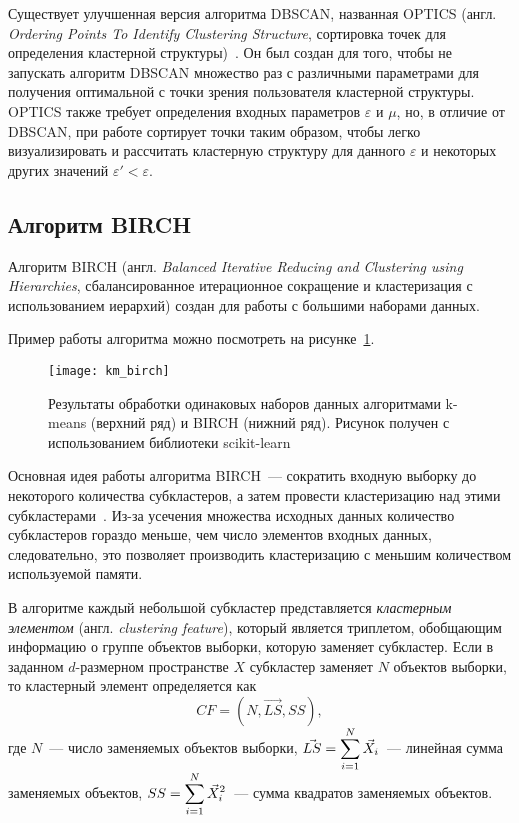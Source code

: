 Существует улучшенная версия алгоритма DBSCAN, названная OPTICS (англ. \emph{Ordering Points To Identify Clustering Structure}, сортировка точек для определения кластерной структуры)~\cite{cod}. Он был создан для того, чтобы не запускать алгоритм DBSCAN множество раз с различными параметрами для получения оптимальной с точки зрения пользователя кластерной структуры. OPTICS также требует определения входных параметров \( \varepsilon \) и \( \mu \), но, в отличие от DBSCAN, при работе сортирует точки таким образом, чтобы легко визуализировать и рассчитать кластерную структуру для данного \( \varepsilon \) и некоторых других значений \( \varepsilon' < \varepsilon \).

\subsection{Алгоритм BIRCH}
Алгоритм BIRCH (англ. \emph{Balanced Iterative Reducing and Clustering using Hierarchies}, сбалансированное итерационное сокращение и кластеризация с использованием иерархий) создан для работы с большими наборами данных.

Пример работы алгоритма можно посмотреть на рисунке~\ref{pic:km-birch}.

\begin{figure}[h!]
    \centering
    \texttt{[image: km\_birch]}\\[1ex]
    \parbox{.9\textwidth}{\caption{Результаты обработки одинаковых наборов данных алгоритмами k-means (верхний ряд) и BIRCH (нижний ряд). Рисунок получен с использованием библиотеки scikit-learn~\cite{sklearn}} \label{pic:km-birch}}
\end{figure}

Основная идея работы алгоритма BIRCH~--- сократить входную выборку до некоторого количества субкластеров, а затем провести кластеризацию над этими субкластерами~\cite{cod}. Из-за усечения множества исходных данных количество субкластеров гораздо меньше, чем число элементов входных данных, следовательно, это позволяет производить кластеризацию с меньшим количеством используемой памяти.

В алгоритме каждый небольшой субкластер представляется \emph{кластерным элементом} (англ. \emph{clustering feature}), который является триплетом, обобщающим информацию о группе объектов выборки, которую заменяет субкластер. Если в заданном \( d \)-размерном пространстве \( X \) субкластер заменяет \( N \) объектов выборки, то кластерный элемент определяется как
\[
    CF = \left(N, \vec{LS}, SS\right),
\]
где \( N \)~--- число заменяемых объектов выборки, \( \displaystyle\vec{LS} = \sum_{i=1}^N \vec{X}_i \)~--- линейная сумма заменяемых объектов, \( \displaystyle SS = \sum_{i=1}^N \vec{X}_i^2 \)~--- сумма квадратов заменяемых объектов.

